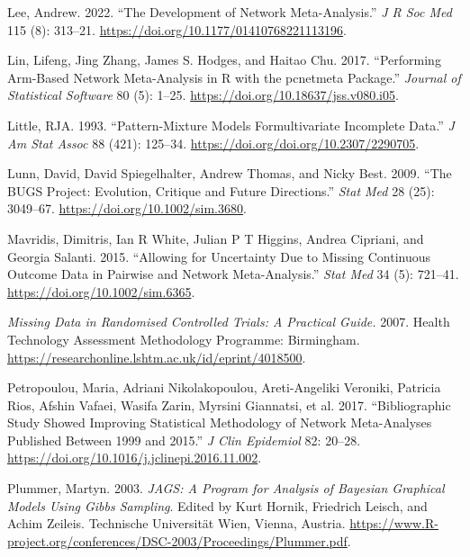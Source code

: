 \begin{CSLReferences}{1}{0}
\leavevmode{}%
Lee, Andrew. 2022. {``The Development of Network Meta-Analysis.''} \emph{J R Soc Med} 115 (8): 313--21. \url{https://doi.org/10.1177/01410768221113196}.

\leavevmode{}%
Lin, Lifeng, Jing Zhang, James S. Hodges, and Haitao Chu. 2017. {``Performing Arm-Based Network Meta-Analysis in {R} with the {pcnetmeta} Package.''} \emph{Journal of Statistical Software} 80 (5): 1--25. \url{https://doi.org/10.18637/jss.v080.i05}.

\leavevmode{}%
Little, RJA. 1993. {``Pattern-Mixture Models Formultivariate Incomplete Data.''} \emph{J Am Stat Assoc} 88 (421): 125--34. \url{https://doi.org/doi.org/10.2307/2290705}.

\leavevmode{}%
Lunn, David, David Spiegelhalter, Andrew Thomas, and Nicky Best. 2009. {``The BUGS Project: Evolution, Critique and Future Directions.''} \emph{Stat Med} 28 (25): 3049--67. \url{https://doi.org/10.1002/sim.3680}.

\leavevmode{}%
Mavridis, Dimitris, Ian R White, Julian P T Higgins, Andrea Cipriani, and Georgia Salanti. 2015. {``Allowing for Uncertainty Due to Missing Continuous Outcome Data in Pairwise and Network Meta-Analysis.''} \emph{Stat Med} 34 (5): 721--41. \url{https://doi.org/10.1002/sim.6365}.

\leavevmode{}%
\emph{Missing Data in Randomised Controlled Trials: A Practical Guide.} 2007. Health Technology Assessment Methodology Programme: Birmingham. \url{https://researchonline.lshtm.ac.uk/id/eprint/4018500}.

\leavevmode{}%
Petropoulou, Maria, Adriani Nikolakopoulou, Areti-Angeliki Veroniki, Patricia Rios, Afshin Vafaei, Wasifa Zarin, Myrsini Giannatsi, et al. 2017. {``Bibliographic Study Showed Improving Statistical Methodology of Network Meta-Analyses Published Between 1999 and 2015.''} \emph{J Clin Epidemiol} 82: 20--28. \url{https://doi.org/10.1016/j.jclinepi.2016.11.002}.

\leavevmode{}%
Plummer, Martyn. 2003. \emph{JAGS: A Program for Analysis of Bayesian Graphical Models Using Gibbs Sampling}. Edited by Kurt Hornik, Friedrich Leisch, and Achim Zeileis. Technische Universität Wien, Vienna, Austria. \url{https://www.R-project.org/conferences/DSC-2003/Proceedings/Plummer.pdf}.


\end{CSLReferences}
